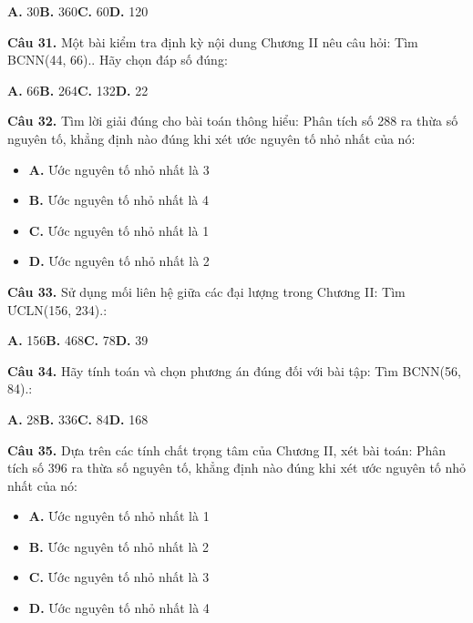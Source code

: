 \documentclass[11pt,a4paper]{article}
\begin{document}
\hspace*{1.5em}\textbf{A.} 30\quad\quad \textbf{B.} 360\quad\quad \textbf{C.} 60\quad\quad \textbf{D.} 120\par\vspace{2pt}
\textbf{\color{primary} Câu 31.} Một bài kiểm tra định kỳ nội dung Chương II nêu câu hỏi: Tìm BCNN(44, 66).. Hãy chọn đáp số đúng:\par
\hspace*{1.5em}\textbf{A.} 66\quad\quad \textbf{B.} 264\quad\quad \textbf{C.} 132\quad\quad \textbf{D.} 22\par\vspace{2pt}
\textbf{\color{primary} Câu 32.} Tìm lời giải đúng cho bài toán thông hiểu: Phân tích số 288 ra thừa số nguyên tố, khẳng định nào đúng khi xét ước nguyên tố nhỏ nhất của nó:\par
\begin{itemize}\setlength{\itemsep}{1pt}\setlength{\parskip}{0pt}
  \item[] \textbf{A.} Ước nguyên tố nhỏ nhất là 3
  \item[] \textbf{B.} Ước nguyên tố nhỏ nhất là 4
  \item[] \textbf{C.} Ước nguyên tố nhỏ nhất là 1
  \item[] \textbf{D.} Ước nguyên tố nhỏ nhất là 2
\end{itemize}\vspace{2pt}
\textbf{\color{primary} Câu 33.} Sử dụng mối liên hệ giữa các đại lượng trong Chương II: Tìm ƯCLN(156, 234).:\par
\hspace*{1.5em}\textbf{A.} 156\quad\quad \textbf{B.} 468\quad\quad \textbf{C.} 78\quad\quad \textbf{D.} 39\par\vspace{2pt}
\textbf{\color{primary} Câu 34.} Hãy tính toán và chọn phương án đúng đối với bài tập: Tìm BCNN(56, 84).:\par
\hspace*{1.5em}\textbf{A.} 28\quad\quad \textbf{B.} 336\quad\quad \textbf{C.} 84\quad\quad \textbf{D.} 168\par\vspace{2pt}
\textbf{\color{primary} Câu 35.} Dựa trên các tính chất trọng tâm của Chương II, xét bài toán: Phân tích số 396 ra thừa số nguyên tố, khẳng định nào đúng khi xét ước nguyên tố nhỏ nhất của nó:\par
\begin{itemize}\setlength{\itemsep}{1pt}\setlength{\parskip}{0pt}
  \item[] \textbf{A.} Ước nguyên tố nhỏ nhất là 1
  \item[] \textbf{B.} Ước nguyên tố nhỏ nhất là 2
  \item[] \textbf{C.} Ước nguyên tố nhỏ nhất là 3
  \item[] \textbf{D.} Ước nguyên tố nhỏ nhất là 4
\end{itemize}\vspace{2pt}
\end{document}
